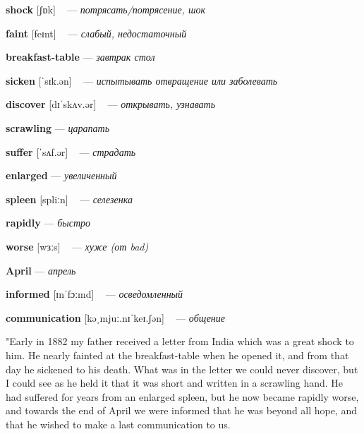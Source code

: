 \documentclass[a4paper,oneside,12pt]{amsart}
\begin{document}
{\large 

 {\bf shock } [ʃɒk] ~ --- \emph{ потрясать/потрясение, шок }

{\bf faint } [feɪnt] ~ --- \emph{ слабый, недостаточный }

{\bf breakfast-table } --- \emph{ завтрак стол }

{\bf sicken } [ˈsɪk.ən] ~ --- \emph{ испытывать отвращение или заболевать }

{\bf discover } [dɪˈskʌv.ər] ~ --- \emph{ открывать, узнавать }

{\bf scrawling } --- \emph{ царапать }

{\bf suffer } [ˈsʌf.ər] ~ --- \emph{ страдать }

{\bf enlarged } --- \emph{ увеличенный }

{\bf spleen } [spliːn] ~ --- \emph{ селезенка }

{\bf rapidly } --- \emph{ быстро }

{\bf worse } [wɜːs] ~ --- \emph{ хуже (от bad) }

{\bf April } --- \emph{ апрель }

{\bf informed } [ɪnˈfɔːmd] ~ --- \emph{ осведомленный }

{\bf communication } [kəˌmjuː.nɪˈkeɪ.ʃən] ~ --- \emph{ общение }

} \vspace{6mm} {\Large 

 
"Early in 1882 my father received a letter from India which was a great shock to him. He nearly fainted at the breakfast-table when he opened it, and from that day he sickened to his death. What was in the letter we could never discover, but I could see as he held it that it was short and written in a scrawling hand. He had suffered for years from an enlarged spleen, but he now became rapidly worse, and towards the end of April we were informed that he was beyond all hope, and that he wished to make a last communication to us.
\\ } 
\end{document}

